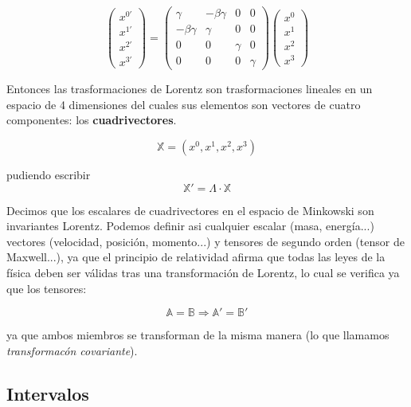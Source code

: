\documentclass[12pt,a4paper]{book}
\begin{document}
\begin{equation}
\begin{pmatrix}
x^{0'}\\ 
x^{1'}\\ 
x^{2'}\\ 
x^{3'}
\end{pmatrix} = 
\begin{pmatrix}
\gamma &
- \beta \gamma &
0 & 0 \\ 
- \beta \gamma &
\gamma &
0 & 0\\ 
0  &
0  &
\gamma & 0 \\
0 & 0 & 0 & \gamma
\end{pmatrix}
\begin{pmatrix}
x^{0} \\ 
x^{1} \\ 
x^{2} \\ 
x^{3} 
\end{pmatrix}
\end{equation}




 Entonces las trasformaciones de Lorentz son trasformaciones lineales en un espacio de 4 dimensiones del cuales sus elementos son vectores de cuatro componentes: los \textbf{cuadrivectores}.

\begin{equation}
\mathbb{X} = (x^0, x^1, x^2, x^3)
\end{equation}

pudiendo escribir
\begin{equation}
\mathbb{X}' = \Lambda \cdot \mathbb{X}
\end{equation}

Decimos que los escalares de cuadrivectores en el espacio de Minkowski son invariantes Lorentz. Podemos definir asi cualquier escalar (masa, energía...) vectores (velocidad, posición, momento...) y tensores de segundo orden (tensor de Maxwell...), ya que el principio de relatividad afirma que todas las leyes de la física deben ser válidas tras una transformación de Lorentz, lo cual se verifica ya que los tensores:

\begin{equation}
\mathbb{A} = \mathbb{B} \Longrightarrow \mathbb{A}' = \mathbb{B}'
\end{equation}

ya que ambos miembros se transforman de la misma manera (lo que llamamos \textit{transformacón covariante}). 

\subsection{Intervalos}
\end{document}
